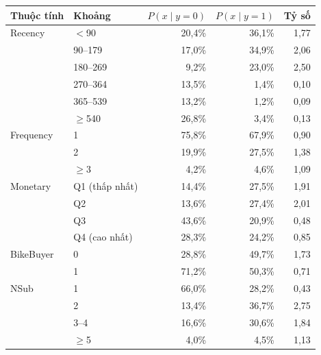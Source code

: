 \begin{tabular}{llrrr}
\toprule
Thuộc tính & Khoảng & $P(x\mid y=0)$ & $P(x\mid y=1)$ & Tỷ số \\
\midrule
Recency & $<$90 & 20,4\% & 36,1\% & 1,77 \\
 & 90--179 & 17,0\% & 34,9\% & 2,06 \\
 & 180--269 & 9,2\% & 23,0\% & 2,50 \\
 & 270--364 & 13,5\% & 1,4\% & 0,10 \\
 & 365--539 & 13,2\% & 1,2\% & 0,09 \\
 & $\geq$540 & 26,8\% & 3,4\% & 0,13 \\
Frequency & 1 & 75,8\% & 67,9\% & 0,90 \\
 & 2 & 19,9\% & 27,5\% & 1,38 \\
 & $\geq$3 & 4,2\% & 4,6\% & 1,09 \\
Monetary & Q1 (thấp nhất) & 14,4\% & 27,5\% & 1,91 \\
 & Q2 & 13,6\% & 27,4\% & 2,01 \\
 & Q3 & 43,6\% & 20,9\% & 0,48 \\
 & Q4 (cao nhất) & 28,3\% & 24,2\% & 0,85 \\
BikeBuyer & 0 & 28,8\% & 49,7\% & 1,73 \\
 & 1 & 71,2\% & 50,3\% & 0,71 \\
NSub & 1 & 66,0\% & 28,2\% & 0,43 \\
 & 2 & 13,4\% & 36,7\% & 2,75 \\
 & 3--4 & 16,6\% & 30,6\% & 1,84 \\
 & $\geq$5 & 4,0\% & 4,5\% & 1,13 \\
\bottomrule
\end{tabular}
